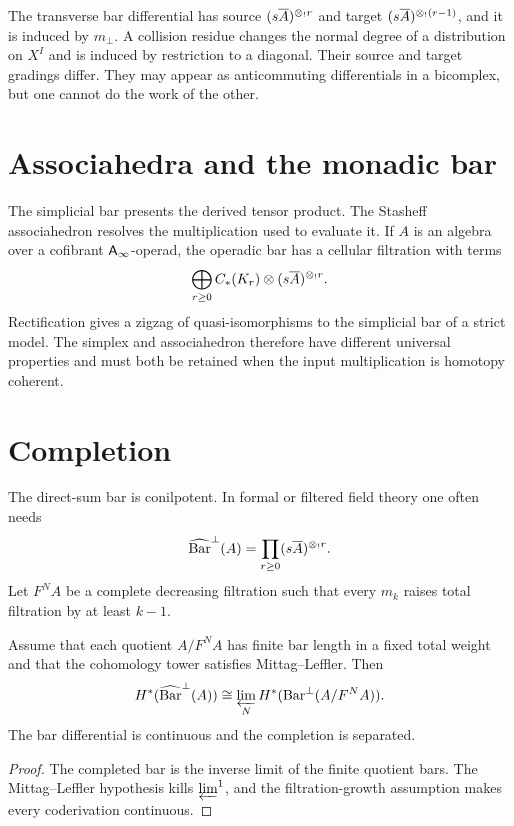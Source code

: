 \begin{nogobox}[title={No-go theorem 7: collision residue cannot replace the bar differential}]
The transverse bar differential has source \((s\overline{A})^{\mathbin{\otimes_{!}} r}\) and target \((s\overline{A})^{\mathbin{\otimes_{!}}(r-1)}\), and it is induced by \(m_\perp\).  A collision residue changes the normal degree of a distribution on \(X^I\) and is induced by restriction to a diagonal.  Their source and target gradings differ.  They may appear as anticommuting differentials in a bicomplex, but one cannot do the work of the other.
\end{nogobox}

\section{Associahedra and the monadic bar}
The simplicial bar presents the derived tensor product.  The Stasheff associahedron resolves the multiplication used to evaluate it.  If \(A\) is an algebra over a cofibrant \(\mathsf A_\infty\)-operad, the operadic bar has a cellular filtration with terms
\[
 \bigoplus_{r\ge0}C_*(K_r)\otimes(s\overline{A})^{\mathbin{\otimes_{!}} r}.
\]
Rectification gives a zigzag of quasi-isomorphisms to the simplicial bar of a strict model.  The simplex and associahedron therefore have different universal properties and must both be retained when the input multiplication is homotopy coherent.

\section{Completion}
The direct-sum bar is conilpotent.  In formal or filtered field theory one often needs
\[
 \widehat{\operatorname{Bar}}^{\perp}(A)=\prod_{r\ge0}(s\overline{A})^{\mathbin{\otimes_{!}} r}.
\]
Let \(F^N A\) be a complete decreasing filtration such that every \(m_k\) raises total filtration by at least \(k-1\).

\begin{proposition}\label{prop:bar-completion}
Assume that each quotient \(A/F^N A\) has finite bar length in a fixed total weight and that the cohomology tower satisfies Mittag--Leffler.  Then
\[
 H^*(\widehat{\operatorname{Bar}}^{\perp}(A))
 \cong\varprojlim_N H^*(\operatorname{Bar}^{\perp}(A/F^N A)).
\]
The bar differential is continuous and the completion is separated.
\end{proposition}
\begin{proof}
The completed bar is the inverse limit of the finite quotient bars.  The Mittag--Leffler hypothesis kills \(\varprojlim^1\), and the filtration-growth assumption makes every coderivation continuous.
\end{proof}

